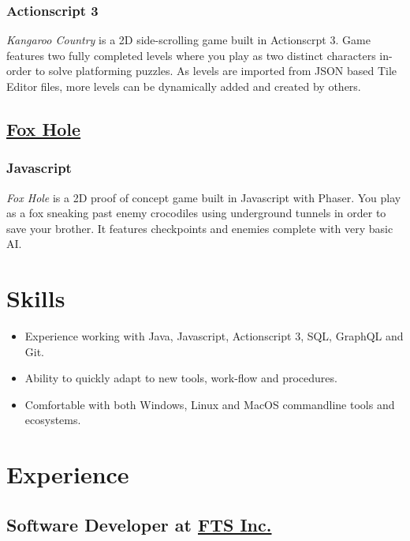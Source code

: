 \documentclass[letterpaper]{article}
\begin{document}
\subsubsection{Actionscript 3}
\label{sec:org7952995}
\emph{Kangaroo Country} is a 2D side-scrolling game built in Actionscrpt 3. Game features two fully completed levels where you play as two distinct characters in-order to solve platforming puzzles. As levels are imported from JSON based Tile Editor files, more levels can be dynamically added and created by others.
\iffalse
\begin{center}
\texttt{[image: ./images/kangaroo/2.png]}
\end{center}
\fi
\subsection{\href{https://github.com/woofers/fox-hole}{Fox Hole}}
\label{sec:org058b7d4}
\subsubsection{Javascript}
\label{sec:org5f7eb1b}
\emph{Fox Hole} is a 2D proof of concept game built in Javascript with Phaser. You play as a fox sneaking past enemy crocodiles using underground tunnels in order to save your brother. It features checkpoints and enemies complete with very basic AI.
\iffalse
\begin{center}
\texttt{[image: ./images/fox/1.png]}
\end{center}
\fi
\section{Skills}
\label{sec:org707ba2d}
\begin{itemize}
\item Experience working with Java, Javascript, Actionscript 3, SQL, GraphQL and Git.
\item Ability to quickly adapt to new tools, work-flow and procedures.
\item Comfortable with both Windows, Linux and MacOS commandline tools and ecosystems.
\end{itemize}
\toggleurlstyle
\section{Experience}
\label{sec:org940ef94}
\subsection{Software Developer at \href{https://ftsinc.com}{FTS Inc.}}
\label{sec:org155feec}
\vspace{-2.4ex}
\end{document}
